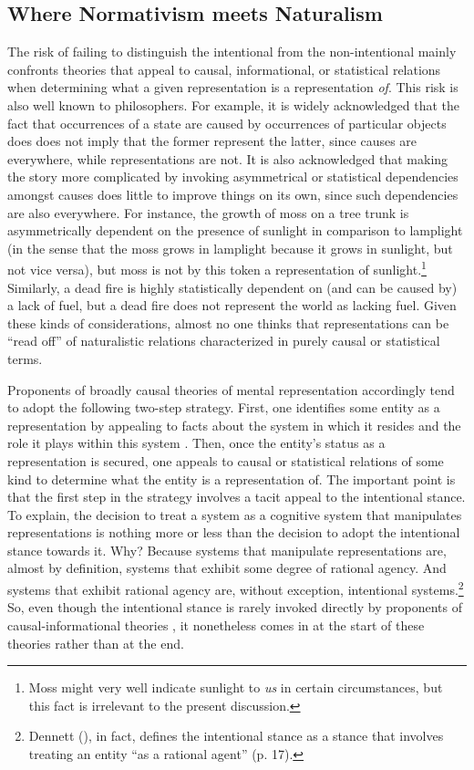 \subsection{Where Normativism meets Naturalism}

The risk of failing to distinguish the intentional from the non-intentional mainly confronts theories that appeal to causal, informational, or statistical relations when determining what a given representation is a representation \textit{of}. This risk is also well known to philosophers. For example, it is widely acknowledged that the fact that occurrences of a state are caused by occurrences of particular objects does does not imply that the former represent the latter, since causes are everywhere, while representations are not. It is also acknowledged that making the story more complicated by invoking asymmetrical \citep[][Ch. 4]{Fodor:1987} or statistical \citep{Eliasmith:2000} dependencies amongst causes does little to improve things on its own, since such dependencies are also everywhere. For instance, the growth of moss on a tree trunk is asymmetrically dependent on the presence of sunlight in comparison to lamplight (in the sense that the moss grows in lamplight because it grows in sunlight, but not vice versa), but moss is not by this token a representation of sunlight.\footnote{Moss might very well indicate sunlight to \textit{us} in certain circumstances, but this fact is irrelevant to the present discussion.} Similarly, a dead fire is highly statistically dependent on (and can be caused by) a lack of fuel, but a dead fire does not represent the world as lacking fuel. Given these kinds of considerations, almost no one thinks that representations can be ``read off'' of naturalistic relations characterized in purely causal or statistical terms. 

Proponents of broadly causal theories of mental representation accordingly tend to adopt the following two-step strategy. First, one identifies some entity as a representation by appealing to facts about the system in which it resides and the role it plays within this system \citep[see e.g.,][]{Eliasmith:2000}. Then, once the entity's status as a representation is secured, one appeals to causal or statistical relations of some kind to determine what the entity is a representation of. The important point is that the first step in the strategy involves a tacit appeal to the intentional stance. To explain, the decision to treat a system as a cognitive system that manipulates representations is nothing more or less than the decision to adopt the intentional stance towards it. Why? Because systems that manipulate representations are, almost by definition, systems that exhibit some degree of rational agency. And systems that exhibit rational agency are, without exception, intentional systems.\footnote{Dennett (\citeyear{Dennett:1987}), in fact, defines the intentional stance as a stance that involves treating an entity ``as a rational agent'' (p. 17).} So, even though the intentional stance is rarely invoked directly by proponents of causal-informational theories \citep[cf.][]{Dretske:1986}, it nonetheless comes in at the start of these theories rather than at the end. 

